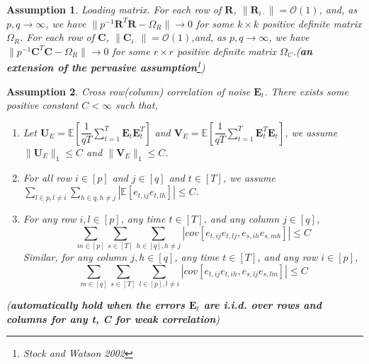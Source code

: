 \documentclass{article}[12pt]
\newtheorem{assumption}{Assumption}
\begin{document}
\begin{assumption}\label{assumption 3 1.7.1}
    Loading matrix. \normalfont For each row of $\mathbf{R}$, $\lVert\mathbf{R}_{i\cdot}\rVert = \mathcal{O}(1)$, and, as $p,q \rightarrow \infty$, we have $\lVert p^{-1}\mathbf{R}^T\mathbf{R}-\Omega_R\rVert \rightarrow 0$ for some $k \times k$ positive definite matrix $\Omega_R$. For each row of $\mathbf{C}$, $\lVert\mathbf{C}_{i\cdot}\rVert = \mathcal{O}(1)$,and, as $p,q \rightarrow \infty$, we have $\lVert p^{-1}\mathbf{C}^T\mathbf{C}-\Omega_R\rVert \rightarrow 0$ for some $r \times r$ positive definite matrix $\Omega_C$.(\textbf{\textit{an extension of the pervasive assumption}}\footnote{Stock and Watson 2002})
\end{assumption}

\begin{assumption}\label{assumption 4 1.7.1}
    Cross row(column) correlation of noise $\mathbf{E}_t$. \normalfont There exists some positive constant $C<\infty$ such that,
    \begin{enumerate}
        \item Let $\mathbf{U}_E = \mathbb{E}\left[\dfrac{1}{qT}\sum_{t=1}^T\mathbf{E}_t\mathbf{E}_t^T\right]$ and $\mathbf{V}_E = \mathbb{E}\left[\dfrac{1}{qT}\sum_{t=1}^T\mathbf{E}_t^T\mathbf{E}_t\right]$, we assume $\lVert\mathbf{U}_E\rVert_1\leq C$ and $\lVert\mathbf{V}_E\rVert_1\leq C$.
        \item For all row $i \in \left[p\right]$ and $j \in \left[q\right]$ and $t \in \left[T\right]$, we assume $\sum_{l \in p, l \neq i}\sum_{h \in q, h \neq j}|\mathbb{E}\left[e_{t,ij}e_{t,lh}\right]|\leq C$.
        \item For any row $i,l \in \left[p\right]$, any time $t \in \left[T\right]$, and any column $j \in \left[q\right]$,
        $$\sum\limits_{m \in \left[p\right]}\sum\limits_{s \in \left[T\right]}\sum\limits_{h \in \left[q\right], h \neq j}|cov\left[e_{t,ij}e_{t,lj},e_{s,ih}e_{s,mh}\right]| \leq C$$
        \noindent Similar, for any column $j,h \in \left[q\right]$, any time $t \in \left[T\right]$, and any row $i \in \left[p\right]$,
        $$\sum\limits_{m \in \left[q\right]}\sum\limits_{s \in \left[T\right]}\sum\limits_{l \in \left[p\right], l \neq i}|cov\left[e_{t,ij}e_{t,ih},e_{s,lj}e_{s,lm}\right]| \leq C$$
    \end{enumerate}
    
    \noindent (\textbf{\textit{automatically hold when the errors $\mathbf{E}_t$ are i.i.d. over rows and columns for any t, C for weak correlation}})
\end{assumption}
\end{document}
